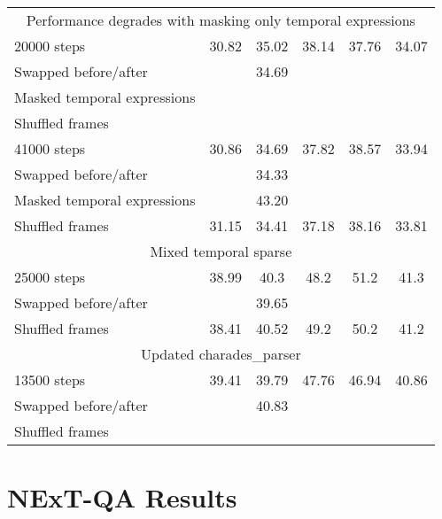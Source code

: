 \begin{table}[htpb]
\begin{tabular}{lccccc}
		\midrule
		\midrule
		\multicolumn{6}{c}{Performance degrades with masking only temporal expressions} \\
		20000 steps					& 30.82		  &	35.02	 & 38.14	  &	37.76		& 34.07 \\
		Swapped before/after		&			  &	34.69	 &			  &				& \\
		Masked temporal expressions	&			  &			 &			  &				& \\
		Shuffled frames				&   &  &   &  & \\
        \cmidrule(r){1-1}             \cmidrule(){2-5}                          \cmidrule(l){6-6}
		41000 steps					& 30.86		  & 34.69    & 37.82      & 38.57       & 33.94 \\
		Swapped before/after		&			  & 34.33	 &		      &				& \\
		Masked temporal expressions &			  & 43.20	 &			  &				& \\
		Shuffled frames				& 31.15		  & 34.41	 & 37.18	  & 38.16		& 33.81 \\
		\midrule
		\midrule
		\multicolumn{6}{c}{Mixed temporal sparse} \\
		25000 steps					& 38.99 & 40.3 & 48.2 & 51.2 & 41.3 \\
		Swapped before/after		&		& 39.65 &	&		& \\
		Shuffled frames				& 38.41 & 40.52 & 49.2 & 50.2 & 41.2 \\
		\midrule
		\midrule
		\multicolumn{6}{c}{Updated charades\_parser} \\
		13500 steps					& 39.41 & 39.79 & 47.76 & 46.94 & 40.86 \\
		Swapped before/after		&		& 40.83	&		&		&	\\
		Shuffled frames				&  &  &  &  &  \\
        \bottomrule
	\end{tabular}
\end{table}

\section{NExT-QA Results}
\label{sec:nextqa_results}

